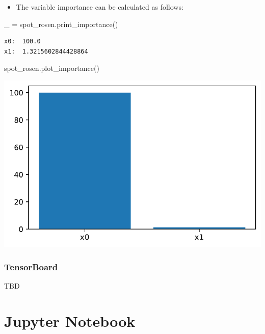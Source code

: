 \documentclass[
  letterpaper,
  DIV=11,
  numbers=noendperiod]{scrreprt}
\newenvironment{Shaded}{\begin{snugshade}}{\end{snugshade}}
\newcommand{\NormalTok}[1]{\textcolor[rgb]{0.00,0.23,0.31}{#1}}
\newcommand{\OperatorTok}[1]{\textcolor[rgb]{0.37,0.37,0.37}{#1}}
\providecommand{\tightlist}{%
  \setlength{\itemsep}{0pt}\setlength{\parskip}{0pt}}\usepackage{longtable,booktabs,array}
\begin{document}
\begin{itemize}
\tightlist
\item
  The variable importance can be calculated as follows:
\end{itemize}

\begin{Shaded}
\begin{Highlighting}[]
\NormalTok{\_ }\OperatorTok{=}\NormalTok{ spot\_rosen.print\_importance()}
\end{Highlighting}
\end{Shaded}

\begin{verbatim}
x0:  100.0
x1:  1.3215602844428864
\end{verbatim}

\begin{Shaded}
\begin{Highlighting}[]
\NormalTok{spot\_rosen.plot\_importance()}
\end{Highlighting}
\end{Shaded}

\includegraphics{008_num_spot_multidim_files/figure-pdf/cell-19-output-1.pdf}

\subsubsection{TensorBoard}\label{tensorboard-3}

TBD

\section{Jupyter Notebook}\label{jupyter-notebook-7}
\end{document}
